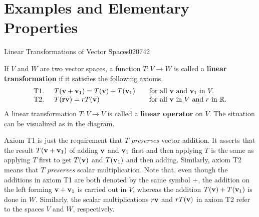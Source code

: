 \section{Examples and Elementary Properties}
\label{sec:7_1}

\begin{definition}{Linear Transformations of Vector Spaces}{020742}
\begin{wrapfigure}[4]{l}{4.5cm}
	\centering
	
\end{wrapfigure}

\setlength{\rightskip}{0pt plus 200pt}
If $V$ and $W$ are two vector spaces, a function $T : V \to W$ is called a \textbf{linear transformation} if it satisfies the following axioms.
\begin{equation*}
\begin{array}{lll}
\mbox{T1. } \quad T(\textbf{v} + \textbf{v}_1) = T(\textbf{v}) + T(\textbf{v}_1) & & \mbox{for all } \textbf{v} \mbox{ and } \textbf{v}_1 \mbox{ in } V. \\
\mbox{T2. } \quad T(\textbf{rv}) = rT(\textbf{v}) & & \mbox{for all } \textbf{v} \mbox{ in } V \mbox{ and } r \mbox{ in } \mathbb{R}.
\end{array}
\end{equation*}
A linear transformation $T : V \to V$ is called a \textbf{linear operator} on $V$. The situation can be visualized as in the diagram.

\end{definition}

Axiom T1 is just the requirement that $T$ \textit{preserves} vector addition. It asserts that the result $T(\textbf{v} + \textbf{v}_{1})$ of adding $\textbf{v}$ and $\textbf{v}_{1}$ first and then applying $T$ is the same as applying $T$ first to get $T(\textbf{v})$ and $T(\textbf{v}_{1})$ and then adding. Similarly, axiom T2 means that $T$ \textit{preserves} scalar multiplication. Note that, even though the additions in axiom T1 are both denoted by the same symbol $+$, the addition on the left forming $\textbf{v} + \textbf{v}_{1}$ is carried out in $V$, whereas the addition $T(\textbf{v}) + T(\textbf{v}_{1})$ is done in $W$. Similarly, the scalar multiplications $r\textbf{v}$ and $rT(\textbf{v})$ in axiom T2 refer to the spaces $V$ and $W$, respectively.


